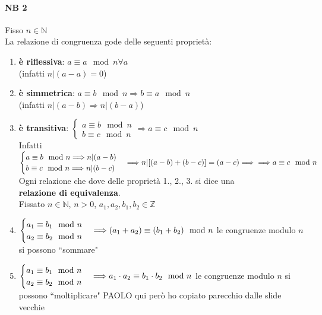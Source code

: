 \paragraph{NB 2} {\color{red} Fisso $n \in \mathbb{N}$}\\
La relazione di congruenza gode delle seguenti proprietà:
\begin{enumerate}
    \item \textbf{è riflessiva}: $a\equiv a\mod n\forall a$\\
        (infatti $n|(a-a)=0$)
    \item \textbf{è simmetrica}: $a\equiv b\mod n\Longrightarrow b\equiv a\mod n$\\
        (infatti $n|(a-b)\Longrightarrow n|(b-a)$)
    \item \textbf{è transitiva}: 
        $
        \begin{cases}
            a\equiv b\mod n\\
            b\equiv c\mod n
        \end{cases}
        \Longrightarrow a\equiv c\mod n
        $\\
        Infatti 
        $
        \begin{cases}
            a\equiv b\mod n\Longrightarrow n|(a-b) \\
            b\equiv c\mod n\Longrightarrow n|(b-c)
        \end{cases}
        \Longrightarrow n|[(a-b)+(b-c)]=(a-c)\Longrightarrow\\
        \Longrightarrow a\equiv c \mod n 
        $\\
        Ogni relazione che dove delle proprietà 1., 2., 3. si dice una \\
        {\color{red}\textbf{relazione di equivalenza}.}\\
        Fissato $n\in\mathbb{N}$, $n>0$, $a_1, a_2, b_1, b_2\in\mathbb{Z}$
    \item 
        $
        \begin{cases}
            a_1\equiv b_1\mod n\\
            a_2\equiv b_2\mod n
        \end{cases}
        \Longrightarrow (a_1 + a_2)\equiv (b_1+b_2)\mod n\\
        $
        {\color{red} le congruenze modulo $n$ si possono ``sommare"}
    \item 
        $
        \begin{cases}
            a_1\equiv b_1\mod n\\
            a_2\equiv b_2\mod n
        \end{cases}
        \Longrightarrow a_1 \cdot a_2\equiv b_1\cdot b_2\mod n\\
        $
        {\color{red} le congruenze modulo $n$ si possono ``moltiplicare"}
        {\color{purple} PAOLO qui però ho copiato parecchio dalle slide vecchie}



\end{enumerate}
